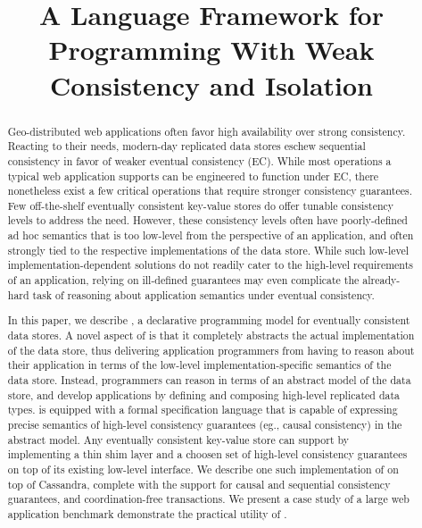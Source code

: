 \documentclass[11pt]{article}
\date{}
\begin{document}
\title{A Language Framework for Programming With Weak Consistency and
Isolation}


\maketitle

\begin{abstract}
Geo-distributed web applications often favor high availability over
strong consistency. Reacting to their needs, modern-day replicated
data stores eschew sequential consistency in favor of weaker eventual
consistency (EC). While most operations a typical web application
supports can be engineered to function under EC, there nonetheless
exist a few critical operations that require stronger consistency
guarantees. Few off-the-shelf eventually consistent key-value stores
do offer tunable consistency levels to address the need. However,
these consistency levels often have poorly-defined ad hoc semantics
that is too low-level from the perspective of an application, and
often strongly tied to the respective implementations of the data
store. While such low-level implementation-dependent solutions do not
readily cater to the high-level requirements of an application,
relying on ill-defined guarantees may even complicate the already-hard
task of reasoning about application semantics under eventual
consistency. 

In this paper, we describe \name, a declarative programming model for
eventually consistent data stores. A novel aspect of \name is that it
completely abstracts the actual implementation of the data store, thus
delivering application programmers from having to reason about their
application in terms of the low-level implementation-specific
semantics of the data store. Instead, programmers can reason in terms
of an abstract model of the data store, and develop applications by
defining and composing high-level replicated data types. \name is
equipped with a formal specification language that is capable of
expressing precise semantics of high-level consistency guarantees
(eg., causal consistency) in the abstract model. Any eventually
consistent key-value store can support \name by implementing a thin
shim layer and a choosen set of high-level consistency guarantees on
top of its existing low-level interface. We describe one such
implementation of \name on top of Cassandra, complete with the support
for causal and sequential consistency guarantees, and
coordination-free transactions. We present a case study of a large web
application benchmark demonstrate the practical utility of \name.


\end{abstract}








{
 \small 
}
\end{document}

